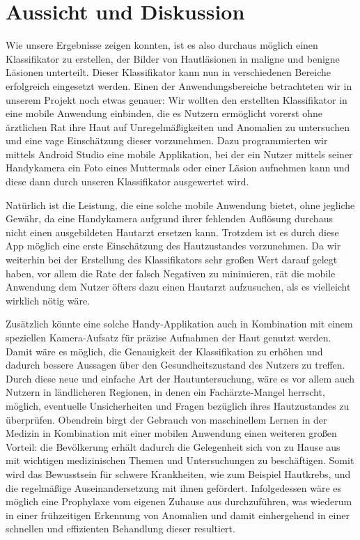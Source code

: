 \section{Aussicht und Diskussion}

Wie unsere Ergebnisse zeigen konnten, ist es also durchaus möglich einen Klassifikator zu erstellen, der Bilder von Hautläsionen in maligne und benigne Läsionen unterteilt. Dieser Klassifikator kann nun in verschiedenen Bereiche erfolgreich eingesetzt werden. Einen der Anwendungsbereiche betrachteten wir in unserem Projekt noch etwas genauer: Wir wollten den erstellten Klassifikator in eine mobile Anwendung einbinden, die es Nutzern ermöglicht vorerst ohne ärztlichen Rat ihre Haut auf Unregelmäßigkeiten und Anomalien zu untersuchen und eine vage Einschätzung dieser vorzunehmen. Dazu programmierten wir mittels Android Studio eine mobile Applikation, bei der ein Nutzer mittels seiner Handykamera ein Foto eines Muttermals oder einer Läsion aufnehmen kann und diese dann durch unseren Klassifikator ausgewertet wird. 

Natürlich ist die Leistung, die eine solche mobile Anwendung bietet, ohne jegliche Gewähr, da eine Handykamera aufgrund ihrer fehlenden Auflösung durchaus nicht einen ausgebildeten Hautarzt ersetzen kann. Trotzdem ist es durch diese App möglich eine erste Einschätzung des Hautzustandes vorzunehmen. Da wir weiterhin bei der Erstellung des Klassifikators sehr großen Wert darauf gelegt haben, vor allem die Rate der falsch Negativen zu minimieren, rät die mobile Anwendung dem Nutzer öfters dazu einen Hautarzt aufzusuchen, als es vielleicht wirklich nötig wäre. 


Zusätzlich könnte eine solche Handy-Applikation auch in Kombination mit einem speziellen Kamera-Aufsatz für präzise Aufnahmen der Haut genutzt werden. Damit wäre es möglich, die Genauigkeit der Klassifikation zu erhöhen und dadurch bessere Aussagen über den Gesundheitszustand des Nutzers zu treffen. Durch diese neue und einfache Art der Hautuntersuchung, wäre es vor allem auch Nutzern in ländlicheren Regionen, in denen ein Fachärzte-Mangel herrscht, möglich, eventuelle Unsicherheiten und Fragen bezüglich ihres Hautzustandes zu überprüfen. Obendrein birgt der Gebrauch von maschinellem Lernen in der Medizin in Kombination mit einer mobilen Anwendung einen weiteren großen Vorteil: die Bevölkerung erhält dadurch die Gelegenheit sich von zu Hause aus mit wichtigen medizinischen Themen und Untersuchungen zu beschäftigen. Somit wird das Bewusstsein für schwere Krankheiten, wie zum Beispiel Hautkrebs, und die regelmäßige Auseinandersetzung mit ihnen gefördert. Infolgedessen wäre es möglich eine Prophylaxe vom eigenen Zuhause aus durchzuführen, was wiederum in einer frühzeitigen Erkennung von Anomalien und damit einhergehend in einer schnellen und effizienten Behandlung dieser resultiert.\newline

